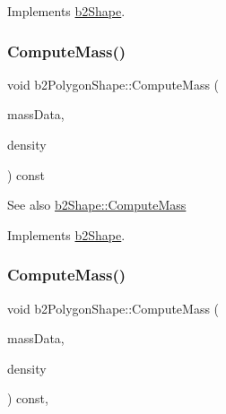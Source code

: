 Implements \hyperlink{classb2Shape_a88e9807fab0c8ca9a98d8926e50a1411}{b2\+Shape}.

\mbox{\label{classb2PolygonShape_a33e75858a1b9e26fdf7f723825cda878}} 
\subsubsection{\texorpdfstring{Compute\+Mass()}{ComputeMass()}\hspace{0.1cm}{\footnotesize\ttfamily [1/2]}}
{\footnotesize\ttfamily void b2\+Polygon\+Shape\+::\+Compute\+Mass (\begin{DoxyParamCaption}\item[{\hyperlink{structb2MassData}{b2\+Mass\+Data} $\ast$}]{mass\+Data,  }\item[{float32}]{density }\end{DoxyParamCaption}) const\hspace{0.3cm}{\ttfamily [virtual]}}

\begin{DoxySeeAlso}{See also}
\hyperlink{classb2Shape_a61b365526241b47f124789b0309cac69}{b2\+Shape\+::\+Compute\+Mass} 
\end{DoxySeeAlso}


Implements \hyperlink{classb2Shape_a61b365526241b47f124789b0309cac69}{b2\+Shape}.

\mbox{\label{classb2PolygonShape_a908db2a51fc79fd49d6fe06be2cd8474}} 
\subsubsection{\texorpdfstring{Compute\+Mass()}{ComputeMass()}\hspace{0.1cm}{\footnotesize\ttfamily [2/2]}}
{\footnotesize\ttfamily void b2\+Polygon\+Shape\+::\+Compute\+Mass (\begin{DoxyParamCaption}\item[{\hyperlink{structb2MassData}{b2\+Mass\+Data} $\ast$}]{mass\+Data,  }\item[{float32}]{density }\end{DoxyParamCaption}) const\hspace{0.3cm}{\ttfamily [override]}, {\ttfamily [virtual]}}

